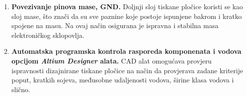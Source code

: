 \documentclass[11pt,a4paper]{article}
\begin{document}
\begin{center}
\begin{enumerate}
		\item \textbf{Povezivanje pinova mase, GND.} Doljnji sloj tiskane pločice koristi se kao sloj mase, što znači da su sve paznine koje postoje ispunjene bakrom i kratko spojene na masu. Na ovaj način osigurana je ispravna i stabilna masa elektroničkog sklopovlja.
		\item \textbf{Automatska programska kontrola rasporeda komponenata i vodova opcijom \textit{Altium Designer} alata.} CAD alat omogućava provjeru ispravnosti dizajnirane tiskane pločice na način da provjerava zadane kriterije poput, kratkih sojeva, međusobne udaljenosti vodova, širine klasa vodova i slično.
	\end{enumerate}
\end{center}
\end{document}

